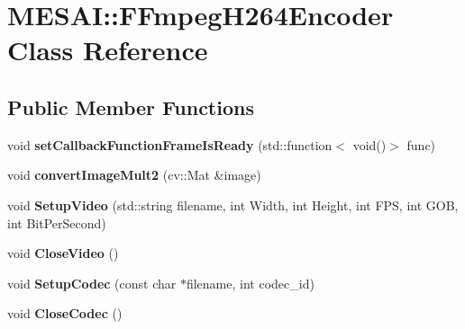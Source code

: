 \hypertarget{class_m_e_s_a_i_1_1_f_fmpeg_h264_encoder}{}\section{M\+E\+S\+AI\+:\+:F\+Fmpeg\+H264\+Encoder Class Reference}
\label{class_m_e_s_a_i_1_1_f_fmpeg_h264_encoder}
\subsection*{Public Member Functions}
\begin{DoxyCompactItemize}
\item 
\mbox{\label{class_m_e_s_a_i_1_1_f_fmpeg_h264_encoder_a242e5d0e654b8f83ca033e637208d0aa}} 
void {\bfseries set\+Callback\+Function\+Frame\+Is\+Ready} (std\+::function$<$ void()$>$ func)
\item 
\mbox{\label{class_m_e_s_a_i_1_1_f_fmpeg_h264_encoder_a14d986ee397f53950a1dce392c942276}} 
void {\bfseries convert\+Image\+Mult2} (cv\+::\+Mat \&image)
\item 
\mbox{\label{class_m_e_s_a_i_1_1_f_fmpeg_h264_encoder_a6a84030b147c3b888e0a4748ceefd0d6}} 
void {\bfseries Setup\+Video} (std\+::string filename, int Width, int Height, int F\+PS, int G\+OB, int Bit\+Per\+Second)
\item 
\mbox{\label{class_m_e_s_a_i_1_1_f_fmpeg_h264_encoder_a5af225d104a7a503c051a1b2275c0bc5}} 
void {\bfseries Close\+Video} ()
\item 
\mbox{\label{class_m_e_s_a_i_1_1_f_fmpeg_h264_encoder_a47a9fee0cf51cf294a939e3778db407d}} 
void {\bfseries Setup\+Codec} (const char $\ast$filename, int codec\+\_\+id)
\item 
\mbox{\label{class_m_e_s_a_i_1_1_f_fmpeg_h264_encoder_a5031f20ba6f4a948a2e1f5aab19fd223}} 
void {\bfseries Close\+Codec} ()
\item 
\mbox{\label{class_m_e_s_a_i_1_1_f_fmpeg_h264_encoder_a31d211927f361f73ea76c8fabf955baf}} 

\end{DoxyCompactItemize}
